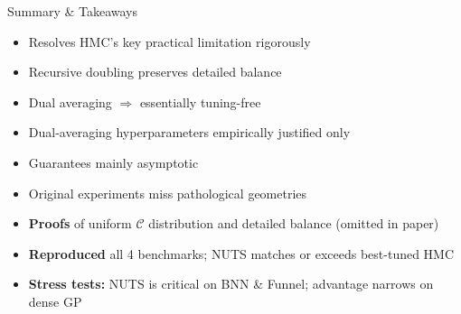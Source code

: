 \documentclass{beamer}
\begin{document}

\begin{frame}{Summary \& Takeaways}
  \noindent
  \begin{minipage}[t]{0.475\textwidth}
    \begin{tcolorbox}[keybox, title=Paper strengths]
      \small
      \begin{itemize}
        \item Resolves HMC's key practical limitation rigorously
        \item Recursive doubling preserves detailed balance
        \item Dual averaging $\Rightarrow$ essentially tuning-free
      \end{itemize}
    \end{tcolorbox}
  \end{minipage}
  \hfill
  \begin{minipage}[t]{0.475\textwidth}
    \begin{tcolorbox}[warnbox, title=Limitations]
      \small
      \begin{itemize}
        \item Dual-averaging hyperparameters empirically justified only
        \item Guarantees mainly asymptotic
        \item Original experiments miss pathological geometries
      \end{itemize}
    \end{tcolorbox}
  \end{minipage}

  \vspace{-0.25cm}

  \begin{tcolorbox}[keybox, title=Our contributions]
    \small
    \begin{itemize}
      \item \textbf{Proofs} of uniform $\mathcal{C}$ distribution and detailed balance (omitted in paper)
      \item \textbf{Reproduced} all 4 benchmarks; NUTS matches or exceeds best-tuned HMC
      \item \textbf{Stress tests:} NUTS is critical on BNN \& Funnel; advantage narrows on dense GP
    \end{itemize}
  \end{tcolorbox}
\end{frame}
\end{document}

